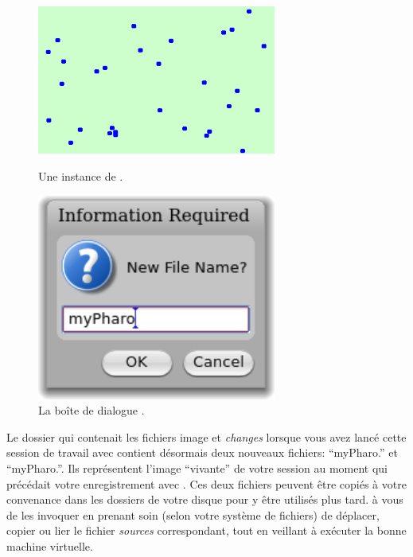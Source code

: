 \documentclass[a4paper,10pt,twoside]{book}
\begin{document}

\begin{figure}[htb]
\begin{minipage}[b]{0.48\textwidth}
 	{\centerline{\includegraphics[width=0.7\textwidth]{atoms}}}
 	\caption{Une instance de \bam.}
\end{minipage}
\hfill
\begin{minipage}[b]{0.48\textwidth}
	{\centerline{\includegraphics[width=0.7\textwidth]{saveAs}}}
 	\caption{La boîte de dialogue .}
\end{minipage}
\end{figure}


Le dossier qui contenait les fichiers image et \emph{changes} lorsque
vous avez lancé cette session de travail avec \pharo contient désormais
deux nouveaux fichiers: ``myPharo.'' et ``myPharo.''. 
Ils représentent l'image ``vivante'' de votre session \pharo au moment qui précédait votre enregistrement avec .
Ces deux fichiers peuvent être copiés à votre convenance dans les
dossiers  de votre disque pour y être utilisés plus tard. à vous de
les invoquer en prenant soin (selon votre système de fichiers) de
déplacer, copier ou lier le fichier \emph{sources} correspondant,
tout en veillant à exécuter la bonne machine virtuelle.
\end{document}
